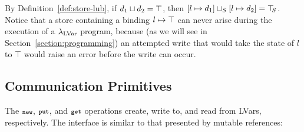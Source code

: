 \DefLeqStore

\DefLubStore

\noindent By Definition~\ref{def:store-lub}, if $d_1 \sqcup d_2 =
\top$, then
$\left[ l \mapsto d_1 \right] \sqcup_{S} \left[ l \mapsto d_2 \right]
= \top\hspace{-0.85mm}_{S}$.  
Notice that a store containing a binding $l \mapsto \top$ can never arise
during the execution of a $\textup{\ensuremath{\lambda_{\textrm{LVar}}}}$ program, because (as we will
see in Section~\ref{section:programming}) an attempted write that would take
the state of $l$ to $\top$ would raise an error before the write can occur.

\subsection{Communication Primitives}\label{subsection:putget}



The $\mbox{\footnotesize \texttt{new}}$, $\mbox{\footnotesize \texttt{put}}$, and $\mbox{\footnotesize \texttt{get}}$ operations create, write to, and read
from LVars, respectively.  The interface is similar to that presented
by mutable references:

